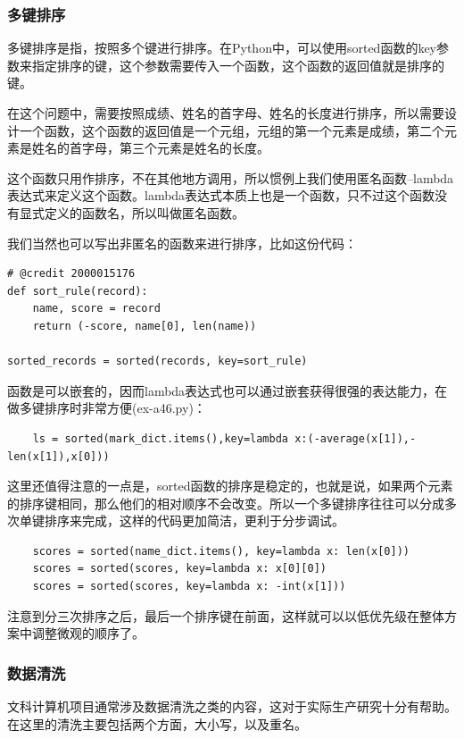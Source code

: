 \documentclass{article}
\begin{document}
\subsubsection{多键排序}

多键排序是指，按照多个键进行排序。在Python中，可以使用sorted函数的key参数来指定排序的键，这个参数需要传入一个函数，这个函数的返回值就是排序的键。

在这个问题中，需要按照成绩、姓名的首字母、姓名的长度进行排序，所以需要设计一个函数，这个函数的返回值是一个元组，元组的第一个元素是成绩，第二个元素是姓名的首字母，第三个元素是姓名的长度。

这个函数只用作排序，不在其他地方调用，所以惯例上我们使用匿名函数--lambda表达式来定义这个函数。lambda表达式本质上也是一个函数，只不过这个函数没有显式定义的函数名，所以叫做匿名函数。


我们当然也可以写出非匿名的函数来进行排序，比如这份代码：
\begin{lstlisting}
# @credit 2000015176
def sort_rule(record):
    name, score = record
    return (-score, name[0], len(name))

sorted_records = sorted(records, key=sort_rule)
\end{lstlisting}

函数是可以嵌套的，因而lambda表达式也可以通过嵌套获得很强的表达能力，在做多键排序时非常方便(ex-a46.py)：
\begin{lstlisting}
    ls = sorted(mark_dict.items(),key=lambda x:(-average(x[1]),-len(x[1]),x[0]))
\end{lstlisting}

这里还值得注意的一点是，sorted函数的排序是稳定的，也就是说，如果两个元素的排序键相同，那么他们的相对顺序不会改变。所以一个多键排序往往可以分成多次单键排序来完成，这样的代码更加简洁，更利于分步调试。

\begin{lstlisting}
    scores = sorted(name_dict.items(), key=lambda x: len(x[0]))
    scores = sorted(scores, key=lambda x: x[0][0])
    scores = sorted(scores, key=lambda x: -int(x[1]))
\end{lstlisting}

注意到分三次排序之后，最后一个排序键在前面，这样就可以以低优先级在整体方案中调整微观的顺序了。

\subsubsection{数据清洗}

文科计算机项目通常涉及数据清洗之类的内容，这对于实际生产研究十分有帮助。在这里的清洗主要包括两个方面，大小写，以及重名。
\end{document}
